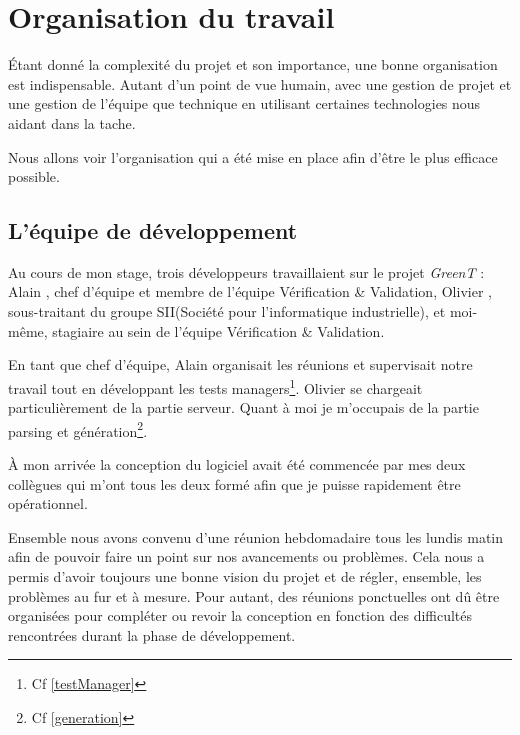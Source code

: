 \chapter{Organisation du travail}\label{chapOrganization}
\begin{figure}
\vspace{-25px}
\hspace{-30px}
\begin{minipage}{0.67\textwidth}
\minitoc
\end{minipage}
\end{figure}
\'Etant donné la complexité du projet et son importance, une bonne organisation est indispensable. Autant d'un point de vue humain, avec une gestion de projet et une gestion de l'équipe que technique en utilisant certaines technologies nous aidant dans la tache. 

Nous allons voir l'organisation qui a été mise en place afin d'être le plus efficace possible.
\vspace{-32px}

\section{L'équipe de développement}
Au cours de mon stage, trois développeurs travaillaient sur le projet \textit{GreenT} : Alain , chef d’équipe et membre de l’équipe Vérification \& Validation, Olivier , sous-traitant du groupe SII(Société pour l'informatique industrielle), et moi-même, stagiaire au sein de l’équipe Vérification \& Validation.

En tant que chef d’équipe, Alain  organisait les réunions et supervisait notre travail tout en développant les tests managers\footnote{Cf \ref{testManager}}. Olivier  se chargeait particulièrement de la partie serveur. Quant à moi je m’occupais de la partie parsing et génération\footnote{Cf \ref{generation}}.

À mon arrivée la conception du logiciel avait été commencée par mes deux collègues qui m’ont tous les deux formé afin que je puisse rapidement être opérationnel.

Ensemble nous avons convenu d’une réunion hebdomadaire tous les lundis matin afin de pouvoir faire un point sur nos avancements ou problèmes. Cela nous a permis d’avoir toujours une bonne vision du projet et de régler, ensemble, les problèmes au fur et à mesure. Pour autant, des réunions ponctuelles ont dû être organisées pour compléter ou revoir la conception en fonction des difficultés rencontrées durant la phase de développement.


